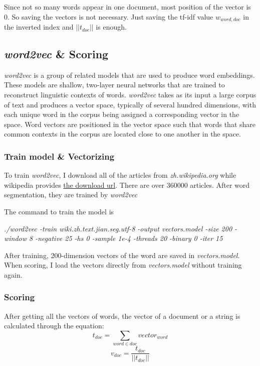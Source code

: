 \documentclass[a4paper]{article}
\begin{document}
Since not so many words appear in one document, most position of the vector is 0. So saving the vectors is not necessary. Just saving the tf-idf value $w_{word,doc}$ in the inverted index and $||t_{doc}||$ is enough.

\subsection{\emph{word2vec} \& Scoring}

\emph{word2vec} is a group of related models that are used to produce word embeddings. These models are shallow, two-layer neural networks that are trained to reconstruct linguistic contexts of words. \emph{word2vec} takes as its input a large corpus of text and produces a vector space, typically of several hundred dimensions, with each unique word in the corpus being assigned a corresponding vector in the space. Word vectors are positioned in the vector space such that words that share common contexts in the corpus are located close to one another in the space.

\subsubsection{Train model \& Vectorizing}

To train \emph{word2vec}, I download all of the articles from \emph{zh.wikipedia.org} while wikipedia provides \href{https://dumps.wikimedia.org/zhwiki/latest/zhwiki-latest-pages-articles.xml.bz2}{the download url}. There are over 360000 articles. After word segmentation, they are trained by \emph{word2vec}

The command to train the model is 

\begin{center}
\emph{./word2vec -train wiki.zh.text.jian.seg.utf-8 -output vectors.model -size 200 -window 8 -negative 25 -hs 0 -sample 1e-4 -threads 20 -binary 0 -iter 15}
\end{center}

After training, 200-dimension vectors of the word are saved in \emph{vectors.model}. When scoring, I load the vectors directly from \emph{vectors.model} without training again.

\subsubsection{Scoring}

After getting all the vectors of words, the vector of a document or a string is calculated through the equation:$$t_{doc}=\sum_{word\in doc}vector_{word}$$$$v_{doc}=\frac{t_{doc}}{||t_{doc}||}$$
\end{document}
